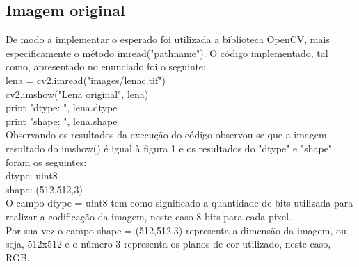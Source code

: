 \documentclass[12pt,a4paper]{article}
\begin{document}
\clearpage

\subsection{Imagem original}
De modo a implementar o esperado foi utilizada a biblioteca OpenCV, mais especificamente o método imread("pathname"). O código implementado, tal como, apresentado no enunciado foi o seguinte:\\
\newline
lena = cv2.imread("images/lenac.tif")\\
cv2.imshow("Lena original", lena)\\
print "dtype: ", lena.dtype\\
print "shape: ", lena.shape\\
\newline
Observando os resultados da execução do código observou-se que a imagem resultado do imshow() é igual à figura 1 e os resultados do "dtype" e "shape" foram os seguintes:\\
\newline
dtype: uint8\\
shape: (512,512,3)\\
\newline
O campo dtype = uint8 tem como significado a quantidade de bits utilizada para realizar a codificação da imagem, neste caso 8 bits para cada pixel.\\
Por sua vez o campo shape = (512,512,3) representa a dimensão da imagem, ou seja, 512x512 e o número 3 representa os planos de cor utilizado, neste caso, RGB.
\end{document}
